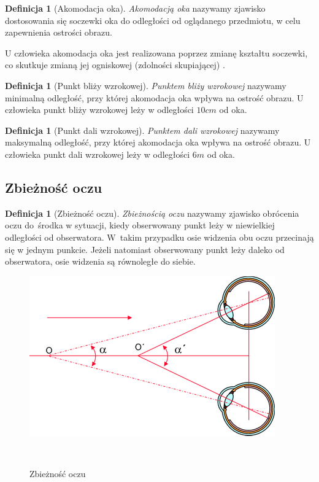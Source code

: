 \documentclass[a4paper,11pt,twoside]{report}
\theoremstyle{definition}
\newtheorem{definition}[theorem]{Definicja}
\begin{document}
\begin{definition}[Akomodacja oka]
\textit{Akomodacją oka} nazywamy zjawisko dostosowania się soczewki oka do odległości od oglądanego przedmiotu, w celu zapewnienia ostrości obrazu.
\end{definition}

U człowieka akomodacja oka jest realizowana poprzez zmianę kształtu soczewki, co skutkuje zmianą jej ogniskowej (zdolności skupiającej) \cite{eyeAccomodation}.

\begin{definition}[Punkt bliży wzrokowej]
\textit{Punktem bliży wzrokowej} nazywamy minimalną odległość, przy której akomodacja oka wpływa na ostrość obrazu. U człowieka punkt bliży wzrokowej leży w odległości $10 cm$ od oka.
\end{definition}

\begin{definition}[Punkt dali wzrokowej]
\textit{Punktem dali wzrokowej} nazywamy maksymalną odległość, przy której akomodacja oka wpływa na ostrość obrazu. U człowieka punkt dali wzrokowej leży w odległości $6 m$ od oka.
\end{definition}

\subsection{Zbieżność oczu}

\begin{definition}[Zbieżność oczu]
\textit{Zbieżnością oczu} nazywamy zjawisko obrócenia oczu do~środka w sytuacji, kiedy obserwowany punkt leży w niewielkiej odległości od obserwatora. W~takim przypadku osie widzenia obu oczu przecinają się w jednym punkcie. Jeżeli natomiast obserwowany punkt leży daleko od obserwatora, osie widzenia są równoległe do siebie.\cite{eyeConvergence}
\end{definition}

\begin{figure}[h]
\centering
\includegraphics[scale=1]{images/zbieznosc}
\caption[Zbieżność oczu\cite{zbieznosc}]{Zbieżność oczu}
\
\end{figure}
\end{document}
